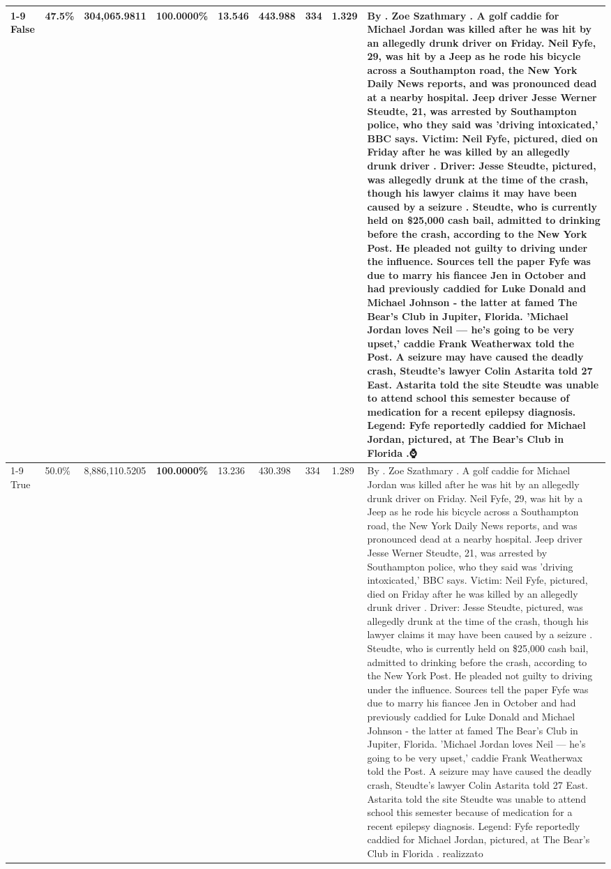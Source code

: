 \begin{table}[H]
\begin{tabular}{lllrlllll}
\cline{1-9}
False & 47.5\% & 304,065.9811 & \bfseries \color{red} 100.0000\% & 13.546 & 443.988 & 334 & 1.329 & By . Zoe Szathmary . A golf caddie for Michael Jordan was killed after he was hit by an allegedly drunk driver on Friday. Neil Fyfe, 29, was hit by a Jeep as he rode his bicycle across a Southampton road, the New York Daily News reports, and was pronounced dead at a nearby hospital. Jeep driver Jesse Werner Steudte, 21, was arrested by Southampton police, who they said was 'driving intoxicated,' BBC says. Victim: Neil Fyfe, pictured, died on Friday after he was killed by an allegedly drunk driver . Driver: Jesse Steudte, pictured, was allegedly drunk at the time of the crash, though his lawyer claims it may have been caused by a seizure . Steudte, who is currently held on \$25,000 cash bail, admitted to drinking before the crash, according to the New York Post. He pleaded not guilty to driving under the influence. Sources tell the paper Fyfe was due to marry his fiancee Jen in October and had previously caddied for Luke Donald and Michael Johnson - the latter at famed The Bear's Club in Jupiter, Florida. 'Michael Jordan loves Neil — he’s going to be very upset,' caddie Frank Weatherwax told the Post. A seizure may have caused the deadly crash, Steudte's lawyer Colin Astarita told 27 East. Astarita told the site Steudte was unable to attend school this semester because of medication for a recent epilepsy diagnosis. Legend: Fyfe reportedly caddied for Michael Jordan, pictured, at The Bear's Club in Florida .⌚ \\
\cline{1-9}
True & 50.0\% & 8,886,110.5205 & \bfseries \color{red} 100.0000\% & 13.236 & 430.398 & 334 & 1.289 & By . Zoe Szathmary . A golf caddie for Michael Jordan was killed after he was hit by an allegedly drunk driver on Friday. Neil Fyfe, 29, was hit by a Jeep as he rode his bicycle across a Southampton road, the New York Daily News reports, and was pronounced dead at a nearby hospital. Jeep driver Jesse Werner Steudte, 21, was arrested by Southampton police, who they said was 'driving intoxicated,' BBC says. Victim: Neil Fyfe, pictured, died on Friday after he was killed by an allegedly drunk driver . Driver: Jesse Steudte, pictured, was allegedly drunk at the time of the crash, though his lawyer claims it may have been caused by a seizure . Steudte, who is currently held on \$25,000 cash bail, admitted to drinking before the crash, according to the New York Post. He pleaded not guilty to driving under the influence. Sources tell the paper Fyfe was due to marry his fiancee Jen in October and had previously caddied for Luke Donald and Michael Johnson - the latter at famed The Bear's Club in Jupiter, Florida. 'Michael Jordan loves Neil — he’s going to be very upset,' caddie Frank Weatherwax told the Post. A seizure may have caused the deadly crash, Steudte's lawyer Colin Astarita told 27 East. Astarita told the site Steudte was unable to attend school this semester because of medication for a recent epilepsy diagnosis. Legend: Fyfe reportedly caddied for Michael Jordan, pictured, at The Bear's Club in Florida . realizzato \\

\end{tabular}
\end{table}
